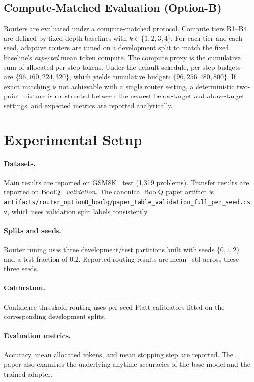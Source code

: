 \documentclass[conference]{IEEEtran}
\begin{document}
\subsection{Compute-Matched Evaluation (Option-B)}
\label{sec:optionb}
Routers are evaluated under a compute-matched protocol. Compute tiers B1--B4 are defined by fixed-depth baselines with $k\in\{1,2,3,4\}$. For each tier and each seed, adaptive routers are tuned on a development split to match the fixed baseline's \emph{expected} mean token compute. The compute proxy is the cumulative sum of allocated per-step tokens. Under the default schedule, per-step budgets are $\{96,160,224,320\}$, which yields cumulative budgets $\{96,256,480,800\}$. If exact matching is not achievable with a single router setting, a deterministic two-point mixture is constructed between the nearest below-target and above-target settings, and expected metrics are reported analytically.

\section{Experimental Setup}
\paragraph{Datasets.}
Main results are reported on GSM8K~\cite{cobbe2021gsm8k} test (1,319 problems). Transfer results are reported on BoolQ~\cite{clark2019boolq} \emph{validation}. The canonical BoolQ paper artifact is \texttt{artifacts/router\_optionB\_boolq/paper\_table\_validation\_full\_per\_seed.csv}, which uses validation split labels consistently.

\paragraph{Splits and seeds.}
Router tuning uses three development/test partitions built with seeds $\{0,1,2\}$ and a test fraction of 0.2. Reported routing results are mean$\pm$std across these three seeds.

\paragraph{Calibration.}
Confidence-threshold routing uses per-seed Platt calibrators fitted on the corresponding development splits.

\paragraph{Evaluation metrics.}
Accuracy, mean allocated tokens, and mean stopping step are reported. The paper also examines the underlying anytime accuracies of the base model and the trained adapter.
\end{document}
